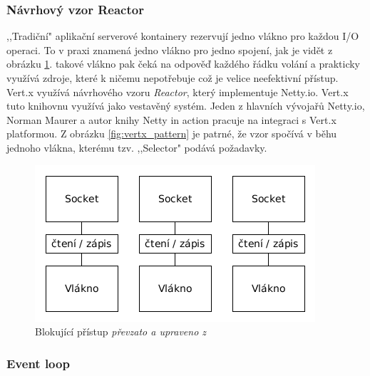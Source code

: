 \subsubsection{Návrhový vzor Reactor}

,,Tradiční" aplikační serverové kontainery rezervují jedno vlákno pro každou I/O operaci. To v praxi znamená jedno vlákno pro jedno spojení, jak je vidět z obrázku \ref{fig:blocking_pattern}. takové vlákno pak čeká na odpověď každého řádku volání a prakticky využívá zdroje, které k ničemu nepotřebuje což je velice neefektivní přístup. Vert.x využívá návrhového vzoru \emph{Reactor}, který implementuje Netty.io. Vert.x tuto knihovnu využívá jako vestavěný systém. Jeden z hlavních vývojařů Netty.io, Norman Maurer a autor knihy Netty in action\cite{nettyInAction} pracuje na integraci s Vert.x platformou. Z obrázku \ref{fig:vertx_pattern} je patrné, že vzor spočívá v běhu jednoho vlákna, kterému tzv. ,,Selector" podává požadavky.

\begin{figure}
\begin{centering}
\includegraphics[scale=0.55]{obrazky/blocking_pattern}
\par\end{centering}
\caption{Blokující přístup \emph{převzato a upraveno z \cite{nettyInAction}}\label{fig:blocking_pattern}}
\end{figure}

\subsubsection{Event loop}

